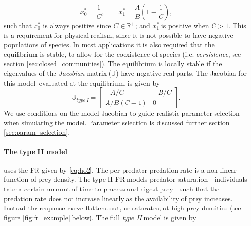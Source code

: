 \begin{equation}\label{eq:lin_mod_eq}
x_{0}^{*} = \frac{1}{C}, 
\qquad
x_{1}^{*} = \frac{A}{B}\left(1 - \frac{1}{C}\right) , 
\end{equation}
%
such that $x_0^*$ is always positive since $C \in \mathbb{R}^+$; and $x_1^*$ is positive when $C>1$. This is a requirement for physical realism, since it is not possible to have negative populations of species. In most applications it is also required that the equilibrium is stable, to allow for the coexistence of species (i.e. \emph{persistence}, see section \ref{sec:closed_communities}). The equilibrium is locally stable if the eigenvalues of the \emph{Jacobian} matrix ($\mathbb{J}$) have negative real parts. The Jacobian for this model, evaluated at the equilibrium, is given by
\begin{equation}\label{eq:jac1}
\mathbb{J}_{type\ I} = 
\begin{bmatrix}
-A/C & -B/C \\ A/B(C-1) & 0
\end{bmatrix}  	.
\end{equation}
%
We use conditions on the model Jacobian to guide realistic parameter selection when simulating the model. Parameter selection is discussed further section \ref{sec:param_selection}. 


\paragraph*{The type II model} uses the FR given by \eqref{eq:ho2}. The per-predator predation rate is a non-linear function of prey density. The type II FR models predator saturation - individuals take a certain amount of time to process and digest prey - such that the predation rate does not increase linearly as the availability of prey increases. Instead the response curve flattens out, or saturates, at high prey densities (see figure \ref{fig:fr_example} below). The full \emph{type II} model is given by

